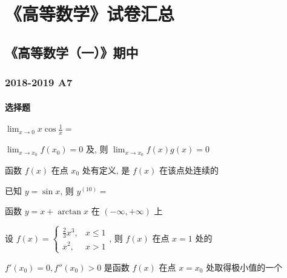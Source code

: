 \chapter{《高等数学》试卷汇总}
\section{《高等数学（一）》期中}
\subsection{2018-2019 A7}
\subsubsection{选择题}
\begin{ti}
	$\lim_{x \to 0} x \cos \frac{1}{x} = $\kuo
\end{ti}

\begin{ti}
	$\lim_{x \to x_{0}} f(x_{0}) = 0$ 及\kuo, 则 $\lim_{x \to x_{0}} f(x) g(x) = 0$
\end{ti}

\begin{ti}
	函数 $f(x)$ 在点 $x_{0}$ 处有定义, 是 $f(x)$ 在该点处连续的\kuo
\end{ti}

\begin{ti}
	已知 $y = \sin x$, 则 $y^{(10)} = $\kuo
\end{ti}

\begin{ti}
	函数 $y = x + \arctan x$ 在 $(-\infty,+\infty)$ 上\kuo
\end{ti}

\begin{ti}
	设 $f(x) = \begin{cases}
		\frac{2}{3}x^{3}, & x \leqslant 1 \\
		x^{2}, & x > 1
	\end{cases}$, 则 $f(x)$ 在点 $x = 1$ 处的\kuo
\end{ti}

\begin{ti}
	$f'(x_{0}) = 0, f''(x_{0}) > 0$ 是函数 $f(x)$ 在点 $x = x_{0}$ 处取得极小值的一个\kuo
\end{ti}

